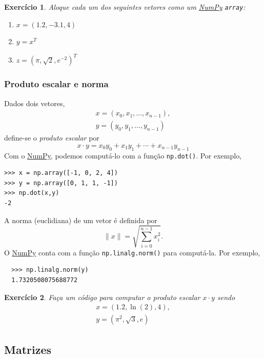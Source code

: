 \documentclass[12pt]{article}
\newtheorem{exr}{Exercício}[section]
\begin{document}
\begin{exr}
  Aloque cada um dos seguintes vetores como um \href{https://numpy.org/}{NumPy} \lstinline+array+:
  \begin{enumerate}
  \item[a)] $x = (1.2, -3.1, 4)$
  \item[b)] $y = x^T$
  \item[c)] $z = (\pi, \sqrt{2}, e^{-2})^T$
  \end{enumerate}
\end{exr}

\subsubsection{Produto escalar e norma}

Dados dois vetores,
\begin{gather}
  x = (x_0, x_1, \dotsc, x_{n-1}),\\
  y = (y_0, y_1, \dotsc, y_{n-1})
\end{gather}
define-se o \emph{produto escalar} por
\begin{equation}
  x\cdot y = x_0y_0 + x_1y_1 + \cdots + x_{n-1}y_{n-1}
\end{equation}
Com o \href{https://numpy.org/}{NumPy}, podemos computá-lo com a função \lstinline+np.dot()+. Por exemplo,
\begin{lstlisting}
>>> x = np.array([-1, 0, 2, 4])
>>> y = np.array([0, 1, 1, -1])
>>> np.dot(x,y)
-2
\end{lstlisting}

A norma (euclidiana) de um vetor é definida por
\begin{equation}
  \|x\| = \sqrt{\sum_{i=0}^{n-1} x_i^2}.
\end{equation}
O \href{https://numpy.org/}{NumPy} conta com a função \lstinline+np.linalg.norm()+ para computá-la. Por exemplo,
\begin{lstlisting}
  >>> np.linalg.norm(y)
  1.7320508075688772
\end{lstlisting}

\begin{exr}
  Faça um código para computar o produto escalar $x\cdot y$ sendo
  \begin{gather}
    x = (1.2, \ln(2), 4),\\
    y = (\pi^2, \sqrt{3}, e)
  \end{gather}
\end{exr}


\subsection{Matrizes}
\end{document}
